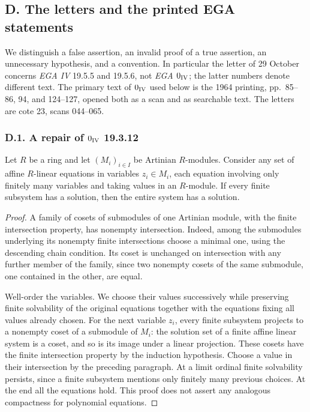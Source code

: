 \subsection{D. The letters and the printed EGA statements}

We distinguish a false assertion, an invalid proof of a true assertion,
an unnecessary hypothesis, and a convention.  In particular the letter
of 29 October concerns \emph{EGA IV} 19.5.5 and 19.5.6, not
\emph{EGA $0_{\rm IV}$}; the latter numbers denote different text.
The primary text of $0_{\rm IV}$ used below is the 1964 printing,
pp.~85--86, 94, and 124--127, opened both as a scan and as searchable
text.  The letters are cote 23, scans 044--065.

\subsubsection{D.1. A repair of $0_{\rm IV}$ 19.3.12}

\begin{lemma}\label{SA23-D-1}
Let $R$ be a ring and let $(M_i)_{i\in I}$ be Artinian $R$-modules.
Consider any set of affine $R$-linear equations in variables
$z_i\in M_i$, each equation involving only finitely many variables
and taking values in an $R$-module.  If every finite subsystem has a
solution, then the entire system has a solution.
\end{lemma}
\begin{proof}
A family of cosets of submodules of one Artinian module, with the
finite intersection property, has nonempty intersection.  Indeed,
among the submodules underlying its nonempty finite intersections
choose a minimal one, using the descending chain condition.  Its
coset is unchanged on intersection with any further member of the
family, since two nonempty cosets of the same submodule, one contained
in the other, are equal.

Well-order the variables.  We choose their values successively while
preserving finite solvability of the original equations together with
the equations fixing all values already chosen.  For the next
variable $z_i$, every finite subsystem projects to a nonempty coset
of a submodule of $M_i$: the solution set of a finite affine linear
system is a coset, and so is its image under a linear projection.
These cosets have the finite intersection property by the induction
hypothesis.  Choose a value in their intersection by the preceding
paragraph.  At a limit ordinal finite solvability persists, since a
finite subsystem mentions only finitely many previous choices.  At
the end all the equations hold.  This proof does not assert any
analogous compactness for polynomial equations.
\end{proof}

